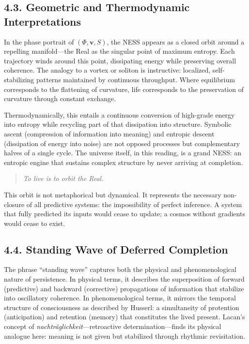 \documentclass[12pt,a4paper]{article}
\begin{document}
\subsection{4.3. Geometric and Thermodynamic Interpretations}

In the phase portrait of \((\Phi,\mathbf{v},S)\), the NESS appears as a closed orbit around a repelling manifold—the Real as the singular point of maximum entropy.  
Each trajectory winds around this point, dissipating energy while preserving overall coherence.  
The analogy to a vortex or soliton is instructive: localized, self-stabilizing patterns maintained by continuous throughput.  
Where equilibrium corresponds to the flattening of curvature, life corresponds to the preservation of curvature through constant exchange.

Thermodynamically, this entails a continuous conversion of high-grade energy into entropy while recycling part of that dissipation into structure.  
Symbolic ascent (compression of information into meaning) and entropic descent (dissipation of energy into noise) are not opposed processes but complementary halves of a single cycle.  
The universe itself, in this reading, is a grand NESS: an entropic engine that sustains complex structure by never arriving at completion.

\begin{quote}
\textit{To live is to orbit the Real.}
\end{quote}

This orbit is not metaphorical but dynamical.  
It represents the necessary non-closure of all predictive systems: the impossibility of perfect inference.  
A system that fully predicted its inputs would cease to update; a cosmos without gradients would cease to exist.

\subsection{4.4. Standing Wave of Deferred Completion}

The phrase “standing wave” captures both the physical and phenomenological nature of persistence.  
In physical terms, it describes the superposition of forward (predictive) and backward (corrective) propagations of information that stabilize into oscillatory coherence.  
In phenomenological terms, it mirrors the temporal structure of consciousness as described by Husserl: a simultaneity of protention (anticipation) and retention (memory) that constitutes the lived present.  
Lacan’s concept of \emph{nachträglichkeit}—retroactive determination—finds its physical analogue here: meaning is not given but stabilized through rhythmic revisitation.
\end{document}
